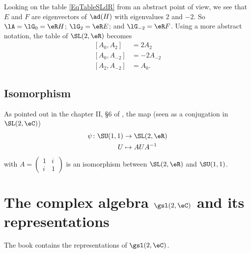 Looking on the table \eqref{EqTableSLdR} from an abstract point of view, we see that $E$ and $F$ are eigenvectors of $\ad(H)$ with eigenvalues $2$ and $-2$. So $\lA=\lG_0=\eR H$; $\lG_2=\eR E$; and $\lG_{-2}=\eR F$. Using a more abstract notation, the table of $\SL(2,\eR)$ becomes
\begin{subequations}  \label{subeq_rootSLR}
	\begin{align}
		[A_{0},A_{2}]  & =2A_{2}   \\
		[A_{0},A_{-2}] & =-2A_{-2} \\
		[A_{2},A_{-2}] & =A_{0}.
	\end{align}
\end{subequations}

\subsection{Isomorphism}

As pointed out in the chapter II, \S6 of \cite{Knapp_reprez}, the map (seen as a conjugation in $\SL(2,\eC)$)
\begin{equation}
	\begin{aligned}
		\psi\colon \SU(1,1) & \to \SL(2,\eR)   \\
		U                   & \mapsto AUA^{-1}
	\end{aligned}
\end{equation}
with $A=\begin{pmatrix}
		1 & i \\i&1
	\end{pmatrix}$ is an isomorphism between $\SL(2,\eR)$ and $\SU(1,1)$.

\section{The complex algebra \texorpdfstring{$\protect\gsl(2,\eC)$}{sl2C} and its representations}
\label{SecsldeuxCandrepres}

The book \cite{Kassel} contains the representations of \( \gsl(2,\eC)\).

